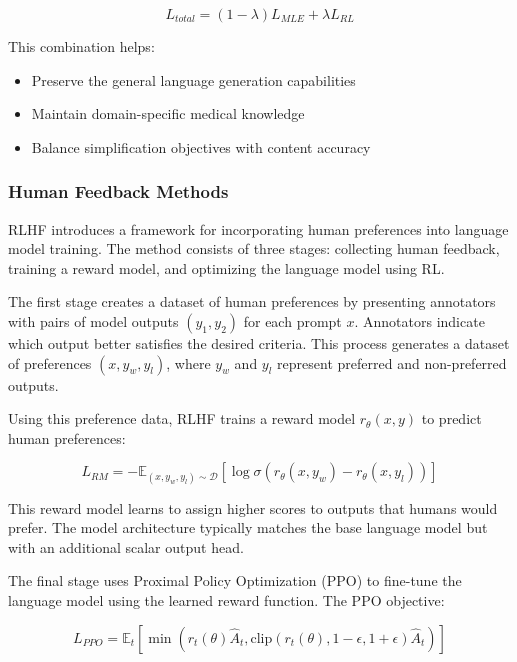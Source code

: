 \begin{equation}
    L_{total} = (1 - \lambda)L_{MLE} + \lambda L_{RL}
\end{equation}

This combination helps:
\begin{itemize}
    \item Preserve the general language generation capabilities
    \item Maintain domain-specific medical knowledge
    \item Balance simplification objectives with content accuracy
\end{itemize}

\subsubsection{Human Feedback Methods}

RLHF introduces a framework for incorporating human preferences into language model training. The method consists of three stages: collecting human feedback, training a reward model, and optimizing the language model using RL.

The first stage creates a dataset of human preferences by presenting annotators with pairs of model outputs $(y_1, y_2)$ for each prompt $x$. Annotators indicate which output better satisfies the desired criteria. This process generates a dataset of preferences $(x, y_w, y_l)$, where $y_w$ and $y_l$ represent preferred and non-preferred outputs.

Using this preference data, RLHF trains a reward model $r_\theta(x,y)$ to predict human preferences:

\begin{equation}
    L_{RM} = -\mathbb{E}_{(x,y_w,y_l)\sim\mathcal{D}}[\log\sigma(r_\theta(x,y_w) - r_\theta(x,y_l))]
\end{equation}

This reward model learns to assign higher scores to outputs that humans would prefer. The model architecture typically matches the base language model but with an additional scalar output head.

The final stage uses Proximal Policy Optimization (PPO) to fine-tune the language model using the learned reward function. The PPO objective:

\begin{equation}
    L_{PPO} = \mathbb{E}_t[\min(r_t(\theta)\hat{A}_t, \text{clip}(r_t(\theta), 1-\epsilon, 1+\epsilon)\hat{A}_t)]
\end{equation}

